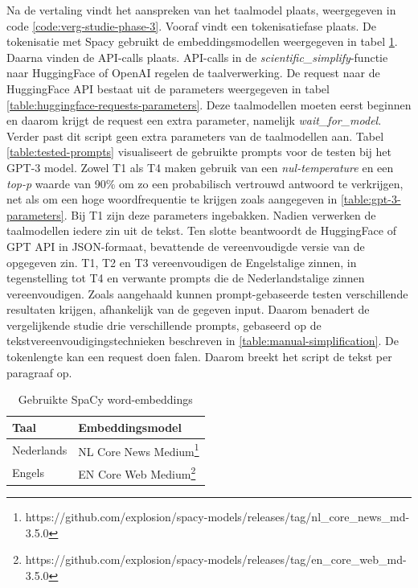 Na de vertaling vindt het aanspreken van het taalmodel plaats, weergegeven in code \ref{code:verg-studie-phase-3}. Vooraf vindt een tokenisatiefase plaats. De tokenisatie met Spacy gebruikt de embeddingsmodellen weergegeven in tabel \ref{table:wordembeddings-spacy}. Daarna vinden de API-calls plaats. API-calls in de \textit{scientific\_simplify}-functie naar HuggingFace of OpenAI regelen de taalverwerking. De request naar de HuggingFace API bestaat uit de parameters weergegeven in tabel \ref{table:huggingface-requests-parameters}. Deze taalmodellen moeten eerst beginnen en daarom krijgt de request een extra parameter, namelijk \textit{wait\_for\_model}. Verder past dit script geen extra parameters van de taalmodellen aan. Tabel \ref{table:tested-prompts} visualiseert de gebruikte prompts voor de testen bij het GPT-3 model. Zowel T1 als T4 maken gebruik van een \textit{nul-temperature} en een \textit{top-p} waarde van 90\% om zo een probabilisch vertrouwd antwoord te verkrijgen, net als om een hoge woordfrequentie te krijgen zoals aangegeven in \ref{table:gpt-3-parameters}. Bij T1 zijn deze parameters ingebakken. Nadien verwerken de taalmodellen iedere zin uit de tekst. Ten slotte beantwoordt de HuggingFace of GPT API in JSON-formaat, bevattende de vereenvoudigde versie van de opgegeven zin. T1, T2 en T3 vereenvoudigen de Engelstalige zinnen, in tegenstelling tot T4 en verwante prompts die de Nederlandstalige zinnen vereenvoudigen. Zoals aangehaald kunnen prompt-gebaseerde testen verschillende resultaten krijgen, afhankelijk van de gegeven input. Daarom benadert de vergelijkende studie drie verschillende prompts, gebaseerd op de tekstvereenvoudigingstechnieken beschreven in \ref{table:manual-simplification}. De tokenlengte kan een request doen falen. Daarom breekt het script de tekst per paragraaf op. 


\begin{center}
	\begin{table}[H]
		\begin{tabular}{ | m{7cm} | m{7cm} | } 
			\hline
			\textbf{Taal} & \textbf{Embeddingsmodel} \\
			\hline
			Nederlands & NL Core News Medium\footnote{https://github.com/explosion/spacy-models/releases/tag/nl\_core\_news\_md-3.5.0} \\ 
			\hline
			Engels & EN Core Web Medium\footnote{https://github.com/explosion/spacy-models/releases/tag/en\_core\_web\_md-3.5.0} \\
			\hline
		\end{tabular}
		\caption{Gebruikte SpaCy word-embeddings}
		\label{table:wordembeddings-spacy}
	\end{table}
\end{center}


